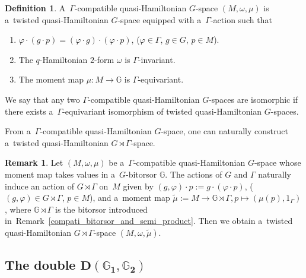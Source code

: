 \documentclass[pdftex]{sigma}
\numberwithin{equation}{section}
\theoremstyle{definition}
\newtheorem{Definition}[Theorem]{Definition}
\newtheorem{Remark}[Theorem]{Remark}
\newcommand{\bG}{\mathbb{G}}
\begin{document}
\begin{Definition}\label{def_compati_q-Ham}
 A~$\Gamma$-compatible quasi-Hamiltonian $G$-space $(M, \omega, \mu)$ is a~twisted quasi-Hamil\-tonian $G$-space equipped with a~$\Gamma$-action such that
\begin{enumerate}\itemsep=0pt
 \item[$(1)$] $\varphi \cdot (g \cdot p) = (\varphi \cdot g) \cdot (\varphi \cdot p)$, ($\varphi \in \Gamma$, $g \in G$, $ p \in M$).
 \item[$(2)$] The $q$-Hamiltonian $2$-form $\omega$ is $\Gamma$-invariant.
 \item[$(3)$] The moment map $\mu \colon M \to \bG$ is $\Gamma$-equivariant.
 \end{enumerate}
We say that any two $\Gamma$-compatible quasi-Hamiltonian $G$-spaces are isomorphic if there exists a~$\Gamma$-equivariant isomorphism of twisted quasi-Hamiltonian $G$-spaces.
\end{Definition}

From a~$\Gamma$-compatible quasi-Hamiltonian $G$-space, one can naturally construct a~twisted quasi-Hamiltonian $G \rtimes \Gamma$-space.
\begin{Remark}\label{cpti_q-Ham_and_twisted_q-Ham}
 Let $(M,\omega,\mu)$ be a~$\Gamma$-compatible quasi-Hamiltonian $G$-space whose moment map takes values in a~$G$-bitorsor $\bG$.
 The actions of $G$ and $\Gamma$ naturally induce an action of $G \rtimes \Gamma$ on~$M$ given by $(g,\varphi) \cdot p := g \cdot (\varphi \cdot p) $, ($(g,\varphi) \in G \rtimes \Gamma$, $ p \in M$),
 and a~moment map $\tilde{\mu} := M \to \bG \rtimes \Gamma, p \mapsto (\mu(p),1_{\Gamma})$,
 where $\bG \rtimes \Gamma$ is the bitorsor introduced in~Remark~\ref{compati_bitorsor_and_semi_product}.
 Then we obtain a~twisted quasi-Hamiltonian $G \rtimes \Gamma$-space $(M,\omega,\tilde{\mu})$.
\end{Remark}

\subsection[The double D(G\_1,G\_2)]{The double $\boldsymbol{\text{D}(\bG_1,\bG_2)}$}\label{the_double}
\end{document}
